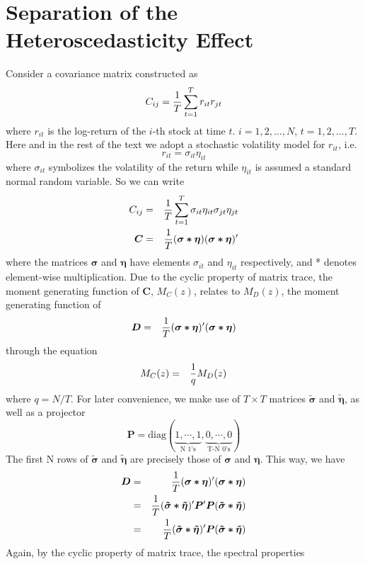 \documentclass{article}
\begin{document}
\section{Separation of the Heteroscedasticity Effect}\label{sec:sep}
Consider a covariance matrix constructed as
$$
C_{ij} = {1 \over T}\sum_{t=1}^T r_{it} r_{jt}
$$
where $r_{it}$ is the log-return of the $i$-th stock at time $t$. $i =
1, 2, \dots, N$, $t = 1,2,\dots,T$. Here and in the rest of the
text we adopt a stochastic volatility model for $r_{it}$, i.e.
$$
r_{it} = \sigma_{it} \eta_{it}
$$
where $\sigma_{it}$ symbolizes the volatility of the return while
$\eta_{it}$ is assumed a standard normal random variable.
So we can write
\begin{eqnarray}
C_{ij} &=& {1 \over T}\sum_{t=1}^T \sigma_{it} \eta_{it} \sigma_{jt}
\eta_{jt} \nonumber \\
\bm{C} &=& {1 \over T} (\bm{\sigma * \eta}) (\bm{\sigma *
  \eta})' \label{eq:C}
\end{eqnarray}
where the matrices $\bm{\sigma}$ and $\bm{\eta}$ have elements
$\sigma_{it}$ and $\eta_{it}$ respectively, and * denotes element-wise
multiplication. Due to the cyclic property of matrix trace, the
moment generating function of $\bm{C}$, $M_C(z)$, relates to $M_D(z)$,
the moment generating function of
\begin{eqnarray*}
  \bm{D} &=& {1 \over T} (\bm{\sigma * \eta})' (\bm{\sigma * \eta})
\end{eqnarray*}
through the equation
\begin{eqnarray*}
  M_C(z) &=& {1 \over q} M_D(z)
\end{eqnarray*}
where $q = N/T$. For later convenience, we make use of $T \times T$
matrices $\bm{\tilde{\sigma}}$ and $\bm{\tilde{\eta}}$, as well as a
projector
$$
\bm{P} = \text{diag}(\underbrace{1, \cdots, 1}_{\text{N 1's}}, 
\underbrace{0, \cdots, 0}_{\text{T-N 0's}})
$$
The first N rows of $\tilde{\bm{\sigma}}$ and $\bm{\tilde{\eta}}$ are
precisely those of $\bm{\sigma}$ and $\bm{\eta}$. This way, we have
\begin{eqnarray*}
\bm D &=& {1 \over T} (\bm{\sigma * \eta})' (\bm{\sigma * \eta}) \\
&=& {1 \over T} (\bm{\tilde{\sigma} * \tilde{\eta}})' \bm P'
\bm P (\bm{\tilde{\sigma} * \tilde{\eta}}) \\
&=& {1 \over T} (\bm{\tilde{\sigma} * \tilde{\eta}})'
\bm P (\bm{\tilde{\sigma} * \tilde{\eta}}) \\
\end{eqnarray*}
Again, by the cyclic property of matrix trace, the spectral properties
\end{document}
